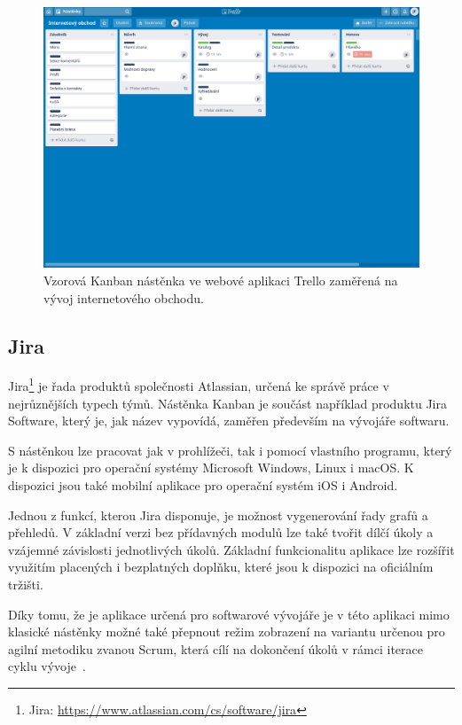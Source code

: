 \begin{figure}[H]
	\centering
	\includegraphics[width=\textwidth]{obrazky-figures/trello.png}
	\caption{Vzorová Kanban nástěnka ve webové aplikaci Trello zaměřená na vývoj internetového obchodu.}
\end{figure}

\subsection{Jira}
Jira\footnote{Jira: \url{https://www.atlassian.com/cs/software/jira}} je řada produktů společnosti Atlassian, určená ke správě práce v nejrůznějších typech týmů. Nástěnka Kanban je součást například produktu Jira Software, který je, jak název vypovídá, zaměřen především na vývojáře softwaru. 

S nástěnkou lze pracovat jak v prohlížeči, tak i pomocí vlastního programu, který je k dispozici pro operační systémy Microsoft Windows, Linux i macOS. K dispozici jsou také mobilní aplikace pro operační systém iOS i Android. 

Jednou z funkcí, kterou Jira disponuje, je možnost vygenerování řady grafů a přehledů. V základní verzi bez přídavných modulů lze také tvořit dílčí úkoly a vzájemné závislosti jednotlivých úkolů. Základní funkcionalitu aplikace lze rozšířit využitím placených i bezplatných doplňku, které jsou k dispozici na oficiálním tržišti.

Díky tomu, že je aplikace určená pro softwarové vývojáře je v této aplikaci mimo klasické nástěnky možné také přepnout režim zobrazení na variantu určenou pro agilní metodiku zvanou Scrum, která cílí na dokončení úkolů v rámci iterace cyklu vývoje~\cite{bib:trello-vs-jira-2020}.

